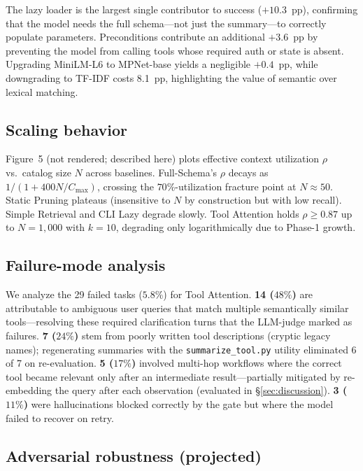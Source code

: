 \documentclass[11pt]{article}
\begin{document}
The lazy loader is the largest single contributor to success ($+10.3$~pp), confirming that the model needs the full schema---not just the summary---to correctly populate parameters. Preconditions contribute an additional $+3.6$~pp by preventing the model from calling tools whose required auth or state is absent. Upgrading MiniLM-L6 to MPNet-base yields a negligible $+0.4$~pp, while downgrading to TF-IDF costs 8.1~pp, highlighting the value of semantic over lexical matching.

\subsection{Scaling behavior}

Figure~5 (not rendered; described here) plots effective context utilization $\rho$ vs.\ catalog size $N$ across baselines. Full-Schema's $\rho$ decays as $1/(1 + 400N/C_{\max})$, crossing the $70\%$-utilization fracture point at $N \approx 50$. Static Pruning plateaus (insensitive to $N$ by construction but with low recall). Simple Retrieval and CLI Lazy degrade slowly. Tool Attention holds $\rho \ge 0.87$ up to $N = 1{,}000$ with $k=10$, degrading only logarithmically due to Phase-1 growth.

\subsection{Failure-mode analysis}

We analyze the 29 failed tasks ($5.8\%$) for Tool Attention. \textbf{14 ($48\%$)} are attributable to ambiguous user queries that match multiple semantically similar tools---resolving these required clarification turns that the LLM-judge marked as failures. \textbf{7 ($24\%$)} stem from poorly written tool descriptions (cryptic legacy names); regenerating summaries with the \texttt{summarize\_tool.py} utility eliminated 6 of 7 on re-evaluation. \textbf{5 ($17\%$)} involved multi-hop workflows where the correct tool became relevant only after an intermediate result---partially mitigated by re-embedding the query after each observation (evaluated in \S\ref{sec:discussion}). \textbf{3 ($11\%$)} were hallucinations blocked correctly by the gate but where the model failed to recover on retry.

\subsection{Adversarial robustness (projected)}
\end{document}

